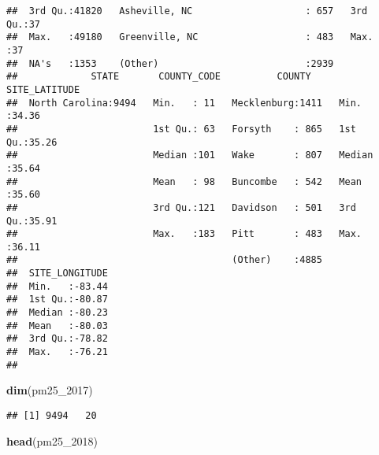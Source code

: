 \documentclass[]{article}
\newenvironment{Shaded}{\begin{snugshade}}{\end{snugshade}}
\newcommand{\KeywordTok}[1]{\textcolor[rgb]{0.13,0.29,0.53}{\textbf{#1}}}
\newcommand{\DecValTok}[1]{\textcolor[rgb]{0.00,0.00,0.81}{#1}}
\newcommand{\NormalTok}[1]{#1}
\begin{document}
\begin{verbatim}
##  3rd Qu.:41820   Asheville, NC                    : 657   3rd Qu.:37  
##  Max.   :49180   Greenville, NC                   : 483   Max.   :37  
##  NA's   :1353    (Other)                          :2939               
##             STATE       COUNTY_CODE          COUNTY     SITE_LATITUDE  
##  North Carolina:9494   Min.   : 11   Mecklenburg:1411   Min.   :34.36  
##                        1st Qu.: 63   Forsyth    : 865   1st Qu.:35.26  
##                        Median :101   Wake       : 807   Median :35.64  
##                        Mean   : 98   Buncombe   : 542   Mean   :35.60  
##                        3rd Qu.:121   Davidson   : 501   3rd Qu.:35.91  
##                        Max.   :183   Pitt       : 483   Max.   :36.11  
##                                      (Other)    :4885                  
##  SITE_LONGITUDE  
##  Min.   :-83.44  
##  1st Qu.:-80.87  
##  Median :-80.23  
##  Mean   :-80.03  
##  3rd Qu.:-78.82  
##  Max.   :-76.21  
## 
\end{verbatim}

\begin{Shaded}
\begin{Highlighting}[]
\KeywordTok{dim}\NormalTok{(pm25_}\DecValTok{2017}\NormalTok{)}
\end{Highlighting}
\end{Shaded}

\begin{verbatim}
## [1] 9494   20
\end{verbatim}

\begin{Shaded}
\begin{Highlighting}[]
\KeywordTok{head}\NormalTok{(pm25_}\DecValTok{2018}\NormalTok{)}
\end{Highlighting}
\end{Shaded}
\end{document}
